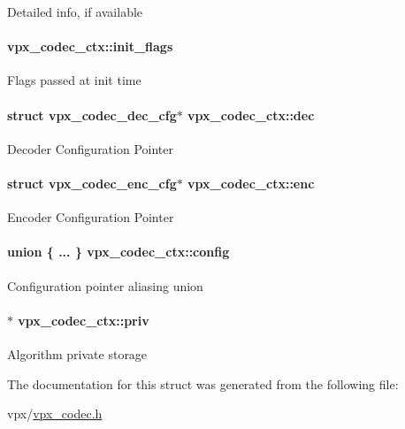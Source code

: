 Detailed info, if available \hypertarget{structvpx__codec__ctx_a76546548086c060a6bd21cb55037fb2b}{
\paragraph[{init\-\_\-flags}]{ vpx\-\_\-codec\-\_\-ctx\-::init\-\_\-flags}}\label{structvpx__codec__ctx_a76546548086c060a6bd21cb55037fb2b}
Flags passed at init time \hypertarget{structvpx__codec__ctx_abb82988485a036fb80e36ed22ec1e984}{
\paragraph[{dec}]{\setlength{\rightskip}{0pt plus 5cm}struct {\bf vpx\-\_\-codec\-\_\-dec\-\_\-cfg}$\ast$ vpx\-\_\-codec\-\_\-ctx\-::dec}}\label{structvpx__codec__ctx_abb82988485a036fb80e36ed22ec1e984}
Decoder Configuration Pointer \hypertarget{structvpx__codec__ctx_a3755f3c166d9aacd8a262a81ac18fa8f}{
\paragraph[{enc}]{\setlength{\rightskip}{0pt plus 5cm}struct {\bf vpx\-\_\-codec\-\_\-enc\-\_\-cfg}$\ast$ vpx\-\_\-codec\-\_\-ctx\-::enc}}\label{structvpx__codec__ctx_a3755f3c166d9aacd8a262a81ac18fa8f}
Encoder Configuration Pointer \hypertarget{structvpx__codec__ctx_aaa15a858376e55269a0a7ba5bff09f04}{
\paragraph[{config}]{\setlength{\rightskip}{0pt plus 5cm}union \{ ... \}                          vpx\-\_\-codec\-\_\-ctx\-::config}}\label{structvpx__codec__ctx_aaa15a858376e55269a0a7ba5bff09f04}
Configuration pointer aliasing union \hypertarget{structvpx__codec__ctx_acee775fd5b7580e112e245ce39733f92}{
\paragraph[{priv}]{$\ast$ vpx\-\_\-codec\-\_\-ctx\-::priv}}\label{structvpx__codec__ctx_acee775fd5b7580e112e245ce39733f92}
Algorithm private storage 

The documentation for this struct was generated from the following file\-:\begin{DoxyCompactItemize}
\item 
vpx/\hyperlink{vpx__codec_8h}{vpx\-\_\-codec.\-h}\end{DoxyCompactItemize}
